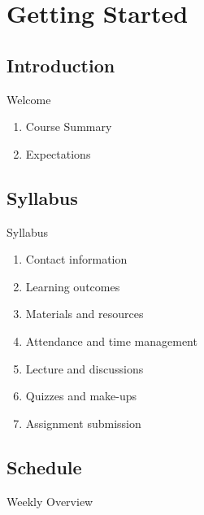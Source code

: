 \section{Getting Started}
\subsection{Introduction}
\begin{frame}{Welcome}
\begin{enumerate}
		\item<1->Course Summary
		\item<2->Expectations
	\end{enumerate}
\end{frame}

\subsection{Syllabus}
\begin{frame}{Syllabus}
\begin{enumerate}
		\item<1->Contact information
		\item<2->Learning outcomes
		\item<3->Materials and resources
		\item<4->Attendance and time management
		\item<5->Lecture and discussions
		\item<6->Quizzes and make-ups
		\item<7->Assignment submission
	\end{enumerate}
\end{frame}

\subsection{Schedule}
\begin{frame}{Weekly Overview}
	\begin{enumerate}
		
	\end{enumerate}
\end{frame}